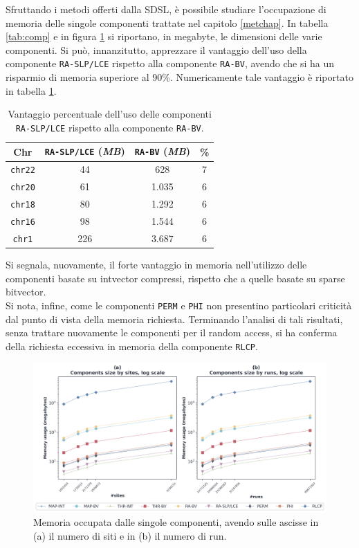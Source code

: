 Sfruttando i metodi offerti dalla SDSL, è possibile studiare
l'occupazione di memoria delle singole componenti trattate nel capitolo
\ref{metchap}. 
In tabella \ref{tab:comp} e in figura \ref{fig:comp}
si riportano, in megabyte, 
le dimensioni delle varie componenti. Si può,
innanzitutto, apprezzare il vantaggio dell'uso della componente
\texttt{RA-SLP/LCE} rispetto alla 
componente \texttt{RA-BV}, avendo che si ha un risparmio di memoria superiore al
90\%. Numericamente tale vantaggio è riportato in tabella
\ref{tab:slppanel}.
\begin{table}
  \centering
  \caption{Vantaggio percentuale dell'uso delle componenti \texttt{RA-SLP/LCE}
    rispetto alla componente \texttt{RA-BV}.}
  \begin{tabular}{c||c|c|c}
    \textbf{Chr} & \textbf{\texttt{RA-SLP/LCE}
                                          (\textit{MB})}
    & \textbf{\texttt{RA-BV} (\textit{MB})} & \textbf{\%}\\
    \hline
    \hline
    \texttt{chr22} & 44 & 628 & 7\\
    \texttt{chr20} & 61 & 1.035 & 6\\
    \texttt{chr18} & 80 & 1.292 & 6\\
    \texttt{chr16} & 98 & 1.544 & 6\\
    \texttt{chr1} & 226 & 3.687 & 6\\
  \end{tabular}
  \label{tab:slppanel}
\end{table}
Si segnala, nuovamente, il
forte vantaggio in memoria nell'utilizzo delle componenti basate su intvector
compressi, rispetto che a quelle basate su sparse bitvector.\\
Si nota, infine, come le componenti \texttt{PERM} e \texttt{PHI} non
presentino particolari criticità dal punto di vista della memoria
richiesta. Terminando l'analisi di tali risultati, senza trattare
nuovamente le componenti per il random access, si ha conferma della
richiesta eccessiva in memoria della componente \texttt{RLCP}.
\begin{figure}
  \centering
    \includegraphics[width=\linewidth]{img/comp_mem.png}
  \caption{Memoria occupata dalle singole componenti, avendo sulle ascisse in
    (a) il numero di siti e in (b) il numero di run. }
  \label{fig:comp}
\end{figure}

